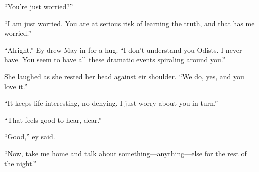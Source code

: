 ``You're just worried?''

``I am just worried. You are at serious risk of learning the truth, and that has me worried.''

``Alright.'' Ey drew May in for a hug. ``I don't understand you Odists. I never have. You seem to have all these dramatic events spiraling around you.''

She laughed as she rested her head against eir shoulder. ``We do, yes, and you love it.''

``It keeps life interesting, no denying. I just worry about you in turn.''

``That feels good to hear, dear.''

``Good,'' ey said.

``Now, take me home and talk about something---anything---else for the rest of the night.''
